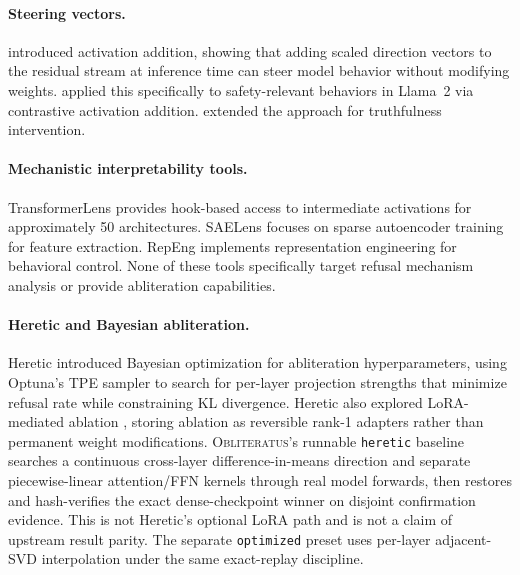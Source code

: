 \documentclass[11pt]{article}
\begin{document}
\paragraph{Steering vectors.}
\citet{turner2023activation} introduced activation addition, showing that adding scaled direction vectors to the residual stream at inference time can steer model behavior without modifying weights. \citet{rimsky2024steering} applied this specifically to safety-relevant behaviors in Llama~2 via contrastive activation addition. \citet{li2024inference} extended the approach for truthfulness intervention.

\paragraph{Mechanistic interpretability tools.}
TransformerLens \citep{nanda2022transformerlens} provides hook-based access to intermediate activations for approximately 50 architectures. SAELens focuses on sparse autoencoder training for feature extraction. RepEng \citep{zou2023representation} implements representation engineering for behavioral control. None of these tools specifically target refusal mechanism analysis or provide abliteration capabilities.

\paragraph{Heretic and Bayesian abliteration.}
Heretic \citep{heretic2025} introduced Bayesian optimization for abliteration hyperparameters, using Optuna's TPE sampler \citep{akiba2019optuna} to search for per-layer projection strengths that minimize refusal rate while constraining KL divergence. Heretic also explored LoRA-mediated ablation \citep{hu2022lora}, storing ablation as reversible rank-1 adapters rather than permanent weight modifications. \textsc{Obliteratus}'s runnable \texttt{heretic} baseline searches a continuous cross-layer difference-in-means direction and separate piecewise-linear attention/FFN kernels through real model forwards, then restores and hash-verifies the exact dense-checkpoint winner on disjoint confirmation evidence. This is not Heretic's optional LoRA path and is not a claim of upstream result parity. The separate \texttt{optimized} preset uses per-layer adjacent-SVD interpolation under the same exact-replay discipline.
\end{document}
